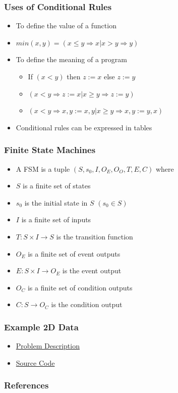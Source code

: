 \documentclass[t,12pt,numbers,fleqn]{beamer}
\begin{document}
\begin{frame}
\frametitle{Uses of Conditional Rules}
\begin{itemize}
\item To define the value of a function
\item $min(x,y) = (x \leq y \Rightarrow x | x > y \Rightarrow y)$
\item To define the meaning of a program
\begin{itemize}
\item If $(x < y)$ then $z := x$ else $z := y$
\item $(x < y \Rightarrow z := x | x \geq y \Rightarrow z:= y)$
\item $(x < y \Rightarrow x, y := x, y | x \geq y \Rightarrow x, y := y, x)$
\end{itemize}
\item Conditional rules can be expressed in tables
\end{itemize}
\end{frame}


\begin{frame}
\frametitle{Finite State Machines}
\begin{itemize}
\item A FSM is a tuple $(S, s_0, I, O_E, O_O, T, E, C)$ where
\item $S$ is a finite set of states
\item $s_0$ is the initial state in $S$ $(s_0 \in S)$
\item $I$ is a finite set of inputs
\item $T: S \times I \rightarrow S$ is the transition function
\item $O_E$ is a finite set of event outputs
\item $E: S\times I \rightarrow O_E$ is the event output
\item $O_C$ is a finite set of condition outputs
\item $C: S \rightarrow O_C$ is the condition output
\end{itemize}
\end{frame}


\begin{frame}
\frametitle{Example 2D Data}
\begin{itemize}
\item
  \href{https://gitlab.cas.mcmaster.ca/smiths/se2aa4_cs2me3/blob/master/Assignments/A2/A2.pdf}
  {Problem Description}
\item \href{https://gitlab.cas.mcmaster.ca/smiths/se2aa4_cs2me3/tree/master/Assignments/A2/A2Soln/src}{Source Code}
\end{itemize}
\end{frame}


\begin{frame}[allowframebreaks]
\frametitle{References}



\end{frame}

\end{document}
